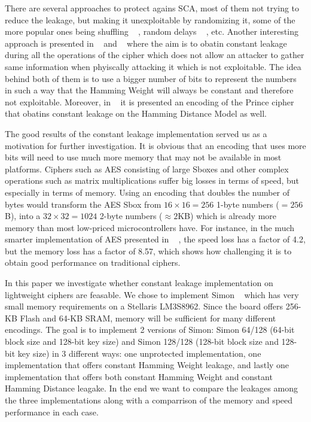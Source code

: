 \documentclass[conference]{IEEEtran}
\begin{document}
There are several approaches to protect agains SCA, most of them not trying to reduce the leakage, but making it unexploitable by randomizing it, some of the more popular ones being shuffling ~\cite{WangShuffling} , random delays ~\cite{CoronRandomDelays} , etc. Another interesting approach is presented in ~\cite{BEPrince} and ~\cite{ServantAES} where the aim is to obatin constant leakage during all the operations of the cipher which does not allow an attacker to gather same information when phyiscally attacking it which is not exploitable. The idea behind both of them is to use a bigger number of bits to represent the numbers in such a way that the Hamming Weight will always be constant and therefore not exploitable. Moreover, in ~\cite{BEPrince} it is presented an encoding of the Prince cipher that obatins constant leakage on the Hamming Distance Model as well.

The good results of the constant leakage implementation served us as a motivation for further investigation. It is obvious that an encoding that uses more bits will need to use much more memory that may not be available in most platforms. Ciphers such as AES consisting of large Sboxes and other complex operations such as matrix multiplications suffer big losses in terms of speed, but especially in terms of memory. Using an encoding that doubles the number of bytes would transform the AES Sbox from $16 \times 16 = 256$ 1-byte numbers ($=256$B), into a $32 \times 32 = 1024$ 2-byte numbers ($\approx2$KB) which is already more memory than most low-priced microcontrollers have. For instance, in the much smarter implementation of AES presented in ~\cite{ServantAES} , the speed loss has a factor of 4.2, but the memory loss has a factor of 8.57, which shows how challenging it is to obtain good performance on traditional ciphers.

In this paper we investigate whether constant leakage implementation on lightweight ciphers are feasable. We chose to implement Simon ~\cite{Beaulieu_Simon} which has very small memory requirements on a Stellaris LM3S8962. Since the board offers 256-KB Flash and 64-KB SRAM, memory will be sufficient for many different encodings. The goal is to implement 2 versions of Simon: Simon 64/128 (64-bit block size and 128-bit key size) and Simon 128/128 (128-bit block size and 128-bit key size) in 3 different ways: one unprotected implementation, one implementation that offers constant Hamming Weight leakage, and lastly one implementation that offers both constant Hamming Weight and constant Hamming Distance leagake. In the end we want to compare the leakages among the three implementations along with a comparrison of the memory and speed performance in each case.
\end{document}
